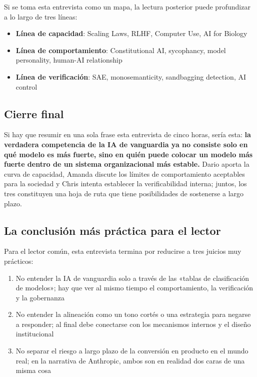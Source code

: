 Si se toma esta entrevista como un mapa, la lectura posterior puede profundizar a lo largo de tres líneas:

\begin{itemize}
    \item \textbf{Línea de capacidad}: Scaling Laws, RLHF, Computer Use, AI for Biology
    \item \textbf{Línea de comportamiento}: Constitutional AI, sycophancy, model personality, human-AI relationship
    \item \textbf{Línea de verificación}: SAE, monosemanticity, sandbagging detection, AI control
\end{itemize}

\subsection{Cierre final}

Si hay que resumir en una sola frase esta entrevista de cinco horas, sería esta: \textbf{la verdadera competencia de la IA de vanguardia ya no consiste solo en qué modelo es más fuerte, sino en quién puede colocar un modelo más fuerte dentro de un sistema organizacional más estable.} Dario aporta la curva de capacidad, Amanda discute los límites de comportamiento aceptables para la sociedad y Chris intenta establecer la verificabilidad interna; juntos, los tres constituyen una hoja de ruta que tiene posibilidades de sostenerse a largo plazo.

\subsection{La conclusión más práctica para el lector}

Para el lector común, esta entrevista termina por reducirse a tres juicios muy prácticos:

\begin{enumerate}
    \item No entender la IA de vanguardia solo a través de las «tablas de clasificación de modelos»; hay que ver al mismo tiempo el comportamiento, la verificación y la gobernanza
    \item No entender la alineación como un tono cortés o una estrategia para negarse a responder; al final debe conectarse con los mecanismos internos y el diseño institucional
    \item No separar el riesgo a largo plazo de la conversión en producto en el mundo real; en la narrativa de Anthropic, ambos son en realidad dos caras de una misma cosa
\end{enumerate}

